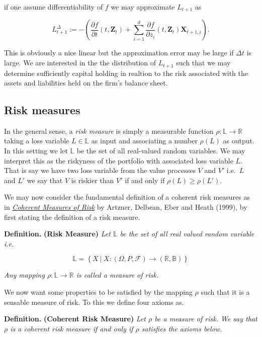 \documentclass[a4paper,12pt,openany]{book}
\begin{document}
if one assume differentiability of \(f\) we may approximate \(L_{t+1}\) as

\[
L_{t+1}^\Delta:=-\left(\frac{\partial f}{\partial t}(t,\mathbf{Z}_t)+\sum_{i=1}^d \frac{\partial f}{\partial z_i}(t,\mathbf{Z}_t)\mathbf{X}_{t+1,i}\right).\tag{2.4}
\]

This is obviously a nice linear but the approximation error may be large if \(\Delta t\) is large. We are interested in the the distribution of \(L_{t+1}\) such that we may determine sufficiently capital holding in realtion to the risk associated with the assets and liabilities held on the firm's balance sheet.

\hypertarget{risk-measures}{%
\subsection{Risk measures}\label{risk-measures}}

In the general sense, a \emph{risk measure} is simply a measurable function \(\rho : \mathbb{L} \to\mathbb{R}\) taking a loss variable \(L\in \mathbb{L}\) as input and associating a number \(\rho(L)\) as output. In this setting we let \(\mathbb{L}\) be the set of all real-valued random variables. We may interpret this as the riskyness of the portfolio with associated loss variable \(L\). That is say we have two loss variable from the value processes \(V\) and \(V'\) i.e.~\(L\) and \(L'\) we say that \(V\) is riskier than \(V'\) if and only if \(\rho(L)\ge \rho(L')\).

We may now consider the fundamental definition of a coherent risk measures as in \href{https://www.researchgate.net/publication/227614132_Coherent_Measures_of_Risk}{\emph{Coherent Measures of Risk}} by Artzner, Delbean, Eber and Heath (1999), by first stating the definition of a risk measure.

\textbf{Definition.} \textbf{(Risk Measure)} \emph{Let \(\mathbb{L}\) be the set of all real valued random variable i.e.}

\[
\mathbb{L}=\left\{X\ \vert \ X : (\Omega,P,\mathcal{F})\to (\mathbb{R},\mathbb{B})\right\}
\]

\emph{Any mapping \(\rho : \mathbb{L} \to\mathbb{R}\) is called a measure of risk.}

We now want some properties to be satisfied by the mapping \(\rho\) such that it is a sensable measure of risk. To this we define four axioms as.

\textbf{Definition.} \textbf{(Coherent Risk Measure)} \emph{Let \(\rho\) be a measure of risk. We say that \(\rho\) is a coherent risk measure if and only if \(\rho\) satisfies the axioms below.}
\end{document}
